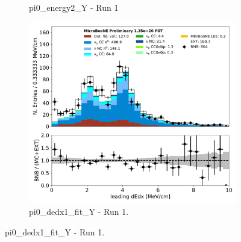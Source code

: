 \documentclass[a4paper]{article}
\begin{document}
\begin{figure}[H]
\begin{center}
\begin{subfigure}[b]{0.3\textwidth}
    \caption{\label{fig:pi0:inputs:energy12:RUN1} pi0\_energy2\_Y - Run 1 }
    \end{subfigure}
    \begin{subfigure}[b]{0.3\textwidth}
    \centering
    \includegraphics[width=1.00\textwidth]{pi0/pi0_dedx1_fit_Y_01152020_inputs_RUN1.pdf}
    \caption{\label{fig:pi0:inputs:gammadot:RUN1} pi0\_dedx1\_fit\_Y - Run 1.}
    \end{subfigure}
\end{center}
\end{figure}
\end{document}
